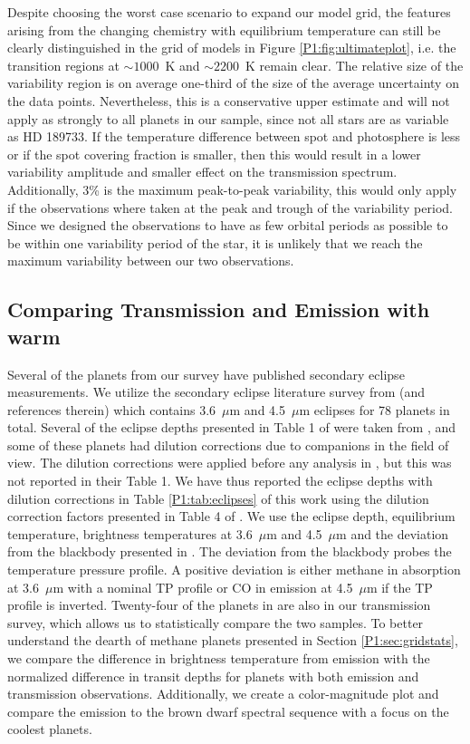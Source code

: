 Despite choosing the worst case scenario to expand our model grid, the features arising from the changing chemistry with equilibrium temperature can still be clearly distinguished in the grid of models in Figure \ref{P1:fig:ultimateplot}, i.e. the transition regions at $\sim1000$~K and $\sim 2200$~K remain clear. The relative size of the variability region is on average one-third of the size of the average uncertainty on the data points. Nevertheless, this is a conservative upper estimate and will not apply as strongly to all planets in our sample, since not all stars are as variable as HD 189733. If the temperature difference between spot and photosphere is less or if the spot covering fraction is smaller, then this would result in a lower variability amplitude and smaller effect on the transmission spectrum. Additionally, 3\% is the maximum peak-to-peak variability, this would only apply if the observations where taken at the peak and trough of the variability period. Since we designed the observations to have as few orbital periods as possible to be within one variability period of the star, it is unlikely that we reach the maximum variability between our two \spitzer observations.

\subsection{Comparing Transmission and Emission with warm \spitzerIRAC}
\label{P1:sec:TvsE}

Several of the planets from our survey have published secondary eclipse measurements. We utilize the secondary eclipse literature survey from \citet{Baxter2020} (and references therein) which contains 3.6~$\mu$m and 4.5~$\mu$m eclipses for 78 planets in total. Several of the eclipse depths presented in Table 1 of \citet{Baxter2020} were taken from \citet{Garhart2020}, and some of these planets had dilution corrections due to companions in the field of view. The dilution corrections were applied before any analysis in \citet{Baxter2020}, but this was not reported in their Table 1. We have thus reported the eclipse depths with dilution corrections in Table \ref{P1:tab:eclipses} of this work using the dilution correction factors presented in Table 4 of \citet{Garhart2020}. We use the eclipse depth, equilibrium temperature, brightness temperatures at 3.6~$\mu$m and 4.5~$\mu$m and the deviation from the blackbody presented in \citet{Baxter2020}. The deviation from the blackbody probes the temperature pressure profile. A positive deviation is either methane in absorption at 3.6~$\mu$m with a nominal TP profile or CO in emission at 4.5~$\mu$m if the TP profile is inverted. Twenty-four of the planets in \citep{Baxter2020} are also in our transmission survey, which allows us to statistically compare the two samples. To better understand the dearth of methane planets presented in Section \ref{P1:sec:gridstats}, we compare the difference in brightness temperature from emission with the normalized difference in transit depths for planets with both emission and transmission observations. Additionally, we create a color-magnitude plot and compare the emission to the brown dwarf spectral sequence with a focus on the coolest planets.

